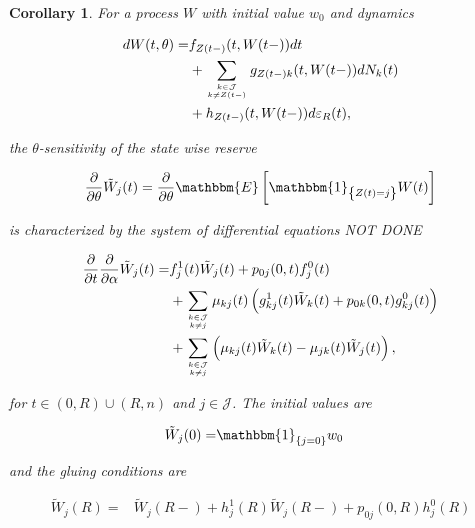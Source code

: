 \documentclass{article}
\newcommand{\1}[1]{\mathbbm{1}_{\left\lbrace #1 \right\rbrace}}
\newcommand{\expec}[1][def]{\mathbbm{E} \left[ #1 \right]}
\theoremstyle{break}
\newtheorem{corollary}[definition]{Corollary}
\theoremstyle{remark}
\numberwithin{equation}{section}
\begin{document}
\begin{corollary} \label{Corollary}
	For a process $W$ with initial value $w_0$ and dynamics
	
	\begin{align*}
		dW(t,\theta) =& f_{Z(t-)}(t,W(t-)) dt \\
		&+ \sum_{k \in \mathcal{J} \atop k \neq Z(t-)} g_{Z(t-)k}(t,W(t-)) dN_{k}(t) \\
		&+ h_{Z(t-)}(t,W(t-)) d \varepsilon_R(t),
	\end{align*}

	the $\theta$-sensitivity of the state wise reserve
	
	\begin{align*}
		\frac{\partial}{\partial \theta} \tilde{W}_j(t) = \frac{\partial}{\partial \theta} \expec[\1{Z(t)=j} W(t)]
	\end{align*}
	
	is characterized by the system of differential equations NOT DONE
	
	\begin{align*}
		\frac{\partial}{\partial t} \frac{\partial}{\partial \alpha} \tilde{W}_j(t) =& f_j^1(t) \tilde{W}_j(t) + p_{0j}(0,t) f_j^0(t) \\
		&+ \sum_{k \in \mathcal{J} \atop k \neq j} \mu_{kj}(t) \left( g_{kj}^1(t) \tilde{W}_k(t) + p_{0k}(0,t) g_{kj}^0(t) \right) \\
		&+ \sum_{k \in \mathcal{J} \atop k \neq j} \left( \mu_{kj}(t) \tilde{W}_k(t) - \mu_{jk}(t) \tilde{W}_j(t) \right),
	\end{align*}
	
	for $t \in (0,R)\cup(R,n)$ and $j \in \mathcal{J}$. The initial values are
	
	\begin{align*}
		\tilde{W}_j(0) =& \1{j=0} w_0
	\end{align*}
	
	and the gluing conditions are
	
	\begin{align*}
		\tilde{W}_j(R) =& \tilde{W}_j(R-) + h_j^1(R) \tilde{W}_j(R-) + p_{0j}(0,R) h_j^0(R)
	\end{align*}
\end{corollary}
\end{document}
